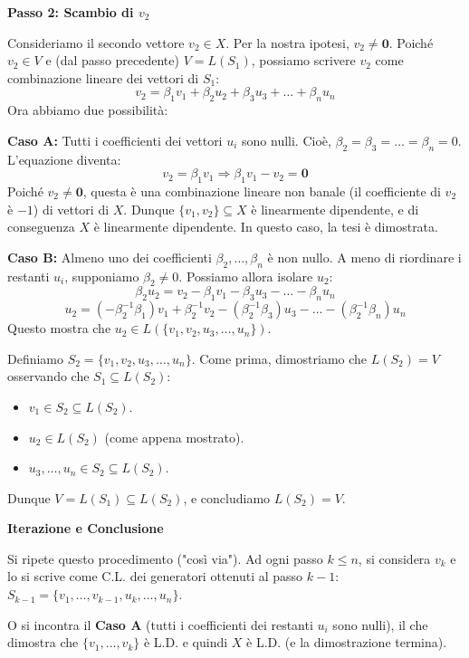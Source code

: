 {{    \textbf{Passo 2: Scambio di \(v_2\)}
    
    Consideriamo il secondo vettore \(v_2 \in X\). Per la nostra ipotesi, \(v_2 \neq \mathbf{0}\).
    Poiché \(v_2 \in V\) e (dal passo precedente) \(V = L(S_1)\), possiamo scrivere \(v_2\) come combinazione lineare dei vettori di \(S_1\):
    \[ v_2 = \beta_1 v_1 + \beta_2 u_2 + \beta_3 u_3 + \dots + \beta_n u_n \]
    Ora abbiamo due possibilità:
    
    \textbf{Caso A:} Tutti i coefficienti dei vettori \(u_i\) sono nulli.
    Cioè, \(\beta_2 = \beta_3 = \dots = \beta_n = 0\). L'equazione diventa:
    \[ v_2 = \beta_1 v_1 \Rightarrow \beta_1 v_1 - v_2 = \mathbf{0} \]
    Poiché \(v_2 \neq \mathbf{0}\), questa è una combinazione lineare non banale (il coefficiente di \(v_2\) è \(-1\)) di vettori di \(X\). Dunque \(\{v_1, v_2\} \subseteq X\) è linearmente dipendente, e di conseguenza \(X\) è linearmente dipendente. In questo caso, la tesi è dimostrata.
    
    \textbf{Caso B:} Almeno uno dei coefficienti \(\beta_2, \dots, \beta_n\) è non nullo.
    A meno di riordinare i restanti \(u_i\), supponiamo \(\beta_2 \neq 0\). 
    Possiamo allora isolare \(u_2\):
    \[ \beta_2 u_2 = v_2 - \beta_1 v_1 - \beta_3 u_3 - \dots - \beta_n u_n \]
    \[ u_2 = (-\beta_2^{-1} \beta_1) v_1 + \beta_2^{-1} v_2 - (\beta_2^{-1} \beta_3) u_3 - \dots - (\beta_2^{-1} \beta_n) u_n \]
    Questo mostra che \( u_2 \in L(\{v_1, v_2, u_3, \dots, u_n\}) \).
    
    Definiamo \(S_2 = \{v_1, v_2, u_3, \dots, u_n\}\). 
    Come prima, dimostriamo che \(L(S_2) = V\) osservando che \(S_1 \subseteq L(S_2)\):
    \begin{itemize}
        \item \( v_1 \in S_2 \subseteq L(S_2) \).
        \item \( u_2 \in L(S_2) \) (come appena mostrato).
        \item \( u_3, \dots, u_n \in S_2 \subseteq L(S_2) \).
    \end{itemize}
    Dunque \( V = L(S_1) \subseteq L(S_2) \), e concludiamo \(L(S_2) = V\).

    \textbf{Iterazione e Conclusione}
    
    Si ripete questo procedimento ("così via"). Ad ogni passo \(k \leq n\), si considera \(v_k\) e lo si scrive come C.L. dei generatori ottenuti al passo \(k-1\): \(S_{k-1} = \{v_1, \dots, v_{k-1}, u_k, \dots, u_n\}\).
    
    O si incontra il \textbf{Caso A} (tutti i coefficienti dei restanti \(u_i\) sono nulli), il che dimostra che \(\{v_1, \dots, v_k\}\) è L.D. e quindi \(X\) è L.D. (e la dimostrazione termina).
    
    
}
}

